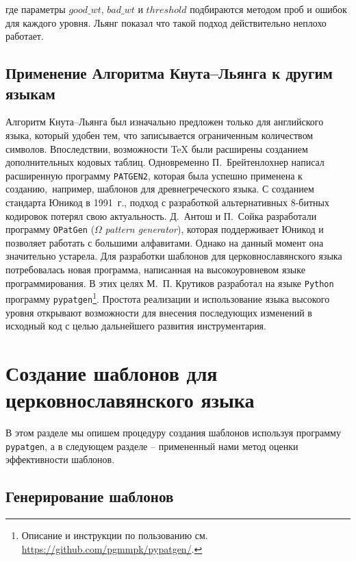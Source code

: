 \documentclass[12pt,a4paper,oneside]{extarticle}
\begin{document}
\noindent где параметры $good\_wt$, $bad\_wt$ и $threshold$ подбираются методом проб и ошибок для каждого уровня.
Льянг показал что такой подход действительно неплохо работает\autocite[Ср.: <<We do not have any theoretical justification for these parameters; they just seem to work well>>.][p.~36]{liang1983}.

\subsection{Применение Алгоритма Кнута--Льянга к другим языкам}

Алгоритм Кнута--Льянга был изначально предложен только для английского языка, который удобен тем, что записывается ограниченным количеством символов. Впоследствии, возможности \TeX{} были расширены созданием дополнительных кодовых таблиц\autocite[Кодировка \textenglish{Extended \TeX{} Font Encoding Scheme} (ET). См. ][]{ferguson1990}. Одновременно П.~Брейтенлохнер написал расширенную программу \verb+PATGEN2+\autocite[См. описание в пособии ][]{patgen2}, которая была успешно применена к созданию, например, шаблонов для древнегреческого языка\autocite[][]{haralambous1992}. С созданием стандарта Юникод в 1991~г., подход с разработкой альтернативных 8-битных кодировок потерял свою актуальность. Д.~Антош и  П.~Сойка разработали программу \texttt{OPatGen} ($\Omega$ \emph{pattern generator}), которая поддерживает Юникод и позволяет работать с большими алфавитами\autocite[][]{sojka2003}. Однако на данный момент она значительно устарела. Для разработки шаблонов для церковнославянского языка потребовалась новая программа, написанная на  высокоуровневом языке программирования. В этих целях М.~П. Крутиков разработал на языке \verb+Python+ программу \verb+pypatgen+\footnote{Описание и инструкции по пользованию см. \url{https://github.com/pgmmpk/pypatgen/}.}. Простота реализации и использование языка высокого уровня открывают возможности для внесения последующих изменений в исходный код с целью дальнейшего развития инструментария.

\section{Создание шаблонов для церковнославянского языка}

В этом разделе мы опишем процедуру создания шаблонов используя программу \verb+pypatgen+, а в следующем разделе -- примененный нами метод оценки эффективности шаблонов.

\subsection{Генерирование шаблонов}
\end{document}
